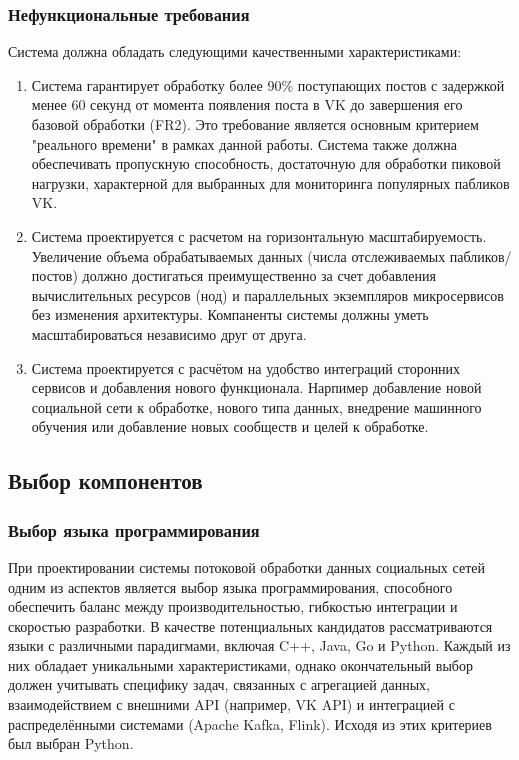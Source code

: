         \subsubsection{Нефункциональные требования}
            Система должна обладать следующими качественными характеристиками:
            \begin{enumerate}
                \item Система гарантирует обработку более 90\% поступающих постов с задержкой менее 60 секунд от момента появления поста в VK до завершения его базовой обработки (FR2). Это требование является основным критерием "реального времени" в рамках данной работы. Система также должна обеспечивать пропускную способность, достаточную для обработки пиковой нагрузки, характерной для выбранных для мониторинга популярных пабликов VK.
                \item Система проектируется с расчетом на горизонтальную масштабируемость. Увеличение объема обрабатываемых данных (числа отслеживаемых пабликов/постов) должно достигаться преимущественно за счет добавления вычислительных ресурсов (нод) и параллельных экземпляров микросервисов без изменения архитектуры. Компаненты системы должны уметь масштабироваться независимо друг от друга.
                \item Система проектируется с расчётом на удобство интеграций сторонних сервисов и добавления нового функционала. Нарпимер добавление новой социальной сети к обработке, нового типа данных, внедрение машинного обучения или добавление новых сообществ и целей к обработке.
            \end{enumerate}

    \subsection{Выбор компонентов}
        \subsubsection{Выбор языка программирования}
            При проектировании системы потоковой обработки данных социальных сетей одним из аспектов является выбор языка программирования, способного обеспечить баланс между производительностью, гибкостью интеграции и скоростью разработки. В качестве потенциальных кандидатов рассматриваются языки с различными парадигмами, включая C++, Java, Go и Python. Каждый из них обладает уникальными характеристиками, однако окончательный выбор должен учитывать специфику задач, связанных с агрегацией данных, взаимодействием с внешними API (например, VK API) и интеграцией с распределёнными системами (Apache Kafka, Flink). Исходя из этих критериев был выбран Python. \\

